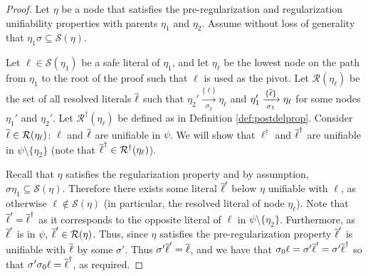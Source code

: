 \begin{proof}
Let $\eta$ be a node that satisfies the pre-regularization and regularization unifiability properties with parents $\eta_1$ and $\eta_2$.
Assume without loss of generality that $\eta_1\sigma \subseteq \mathcal{S}(\eta)$.


Let $\ell \in \mathcal{S}(\eta_1)$ be a safe literal of $\eta_1$, and let $\eta_\ell$ be the lowest node on the path from $\eta_1$ to the root of the proof such that $\ell$ is used as the pivot.
Let $\mathcal{R}(\eta_\ell)$ be the set of all resolved literals $\overline{\ell}$ such that $\eta_2' \xrightarrow[\sigma_2]{\{\ell\} } \eta_\ell$ and $\eta_1' \xrightarrow[\sigma_1]{\{\overline{\ell}\} } \eta_\ell$ for some nodes $\eta_1'$ and $\eta_2'$. Let $\mathcal{R}^\dagger(\eta_\ell)$ be defined as in Definition \ref{def:postdelprop}.
Consider $\overline{\ell} \in \mathcal{R}(\eta_\ell)$: $\ell$ and $\overline{\ell}$ are unifiable in $\psi$. We will show that $\ell^\dagger$ and $\overline{\ell}^\dagger$ are unifiable in $\psi\setminus\{\eta_2\}$ (note that $\overline{\ell}^\dagger\in \mathcal{R}^\dagger(\eta_\ell)$). 



Recall that $\eta$ satisfies the regularization property and by assumption, $\sigma\eta_1\subseteq \mathcal{S}(\eta)$. Therefore there exists some literal $\overline{\ell}'$ below $\eta$ unifiable with $\ell$, as otherwise $\ell \notin \mathcal{S}(\eta)$ (in particular, the resolved literal of node $\eta_\ell$). Note that $\overline{\ell}'=\overline{\ell}^\dagger$ as it corresponds to the opposite literal of $\ell$ in $\psi \setminus \{\eta_2\}$.  Furthermore, as $\overline{\ell}'$ is in $\psi$, $\overline{\ell}'\in \mathcal{R}(\eta)$. Thus, since $\eta$ satisfies the pre-regularization property $\overline{\ell}'$ is unifiable with $\overline{\ell}$ by some $\sigma'$. Thus $\sigma'\overline{\ell}'=\overline{\ell}$, and we have that $\sigma_0\ell = \sigma'\overline{\ell}'=\sigma'\overline{\ell}^\dagger$ so that $\sigma'\sigma_0\ell = \overline{\ell}^\dagger$, as required.

\end{proof}


